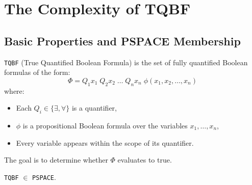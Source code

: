 \section{The Complexity of TQBF}

\subsection{Basic Properties and PSPACE Membership}

\begin{definition}[TQBF]
\texttt{TQBF} (True Quantified Boolean Formula) is the set of fully quantified Boolean formulas of the form:
\[
\Phi = Q_1 x_1 \; Q_2 x_2 \; \dots \; Q_n x_n \; \phi(x_1, x_2, \dots, x_n)
\]
where:
\begin{itemize}
    \item Each $Q_i \in \{\exists, \forall\}$ is a quantifier,
    \item $\phi$ is a propositional Boolean formula over the variables $x_1, \dots, x_n$,
    \item Every variable appears within the scope of its quantifier.
\end{itemize}
The goal is to determine whether $\Phi$ evaluates to true.
\end{definition}

\begin{theorem}
\texttt{TQBF} $\in$ \texttt{PSPACE}.
\end{theorem}

